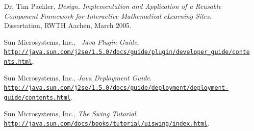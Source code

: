 \documentclass[a4paper,12pt]{article}
\begin{document}
\begin{thebibliography}{9}
 
  Dr. Tim Paehler,
  \emph{Design, Implementation and Application of a Reusable Component Framework for Interactive
  Mathematical eLearning Sites}.
  Dissertation, RWTH Aachen,
  March 2005.
 
  Sun Microsystems, Inc.,~
  \emph{Java Plugin Guide}.~ \texttt{\url{http://java.sun.com/j2se/1.5.0/docs/guide/plugin/developer_guide/contents.html}}.
 
  Sun Microsystems, Inc.,
  \emph{Java Deployment Guide}. \texttt{\url{http://java.sun.com/j2se/1.5.0/docs/guide/deployment/deployment-guide/contents.html}}.
 
  Sun Microsystems, Inc.,
  \emph{The Swing Tutorial}. \texttt{\url{http://java.sun.com/docs/books/tutorial/uiswing/index.html}}.
 
\end{thebibliography}
\end{document}
